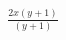 \documentclass[preview]{standalone}
\begin{document}
\begin{align*}
\frac{2 x \left( y + 1 \right)}{\left( y + 1 \right)}
\end{align*}
\end{document}
